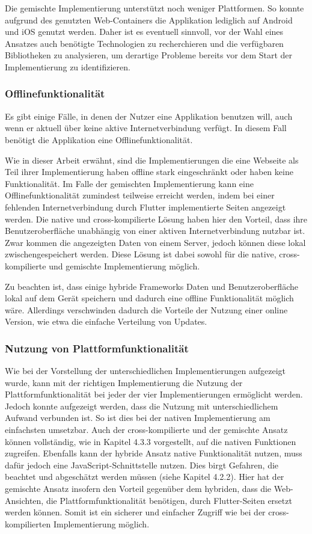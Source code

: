 Die gemischte Implementierung unterstützt noch weniger Plattformen. So konnte aufgrund des genutzten Web-Containers die Applikation lediglich auf Android und iOS genutzt werden.
Daher ist es eventuell sinnvoll, vor der Wahl eines Ansatzes auch benötigte Technologien zu recherchieren und die verfügbaren Bibliotheken zu analysieren, um derartige Probleme bereits vor dem Start der Implementierung zu identifizieren.


\subsubsection{Offlinefunktionalität}
Es gibt einige Fälle, in denen der Nutzer eine Applikation benutzen will, auch wenn er aktuell über keine aktive Internetverbindung verfügt. In diesem Fall benötigt die Applikation eine Offlinefunktionalität.

Wie in dieser Arbeit erwähnt, sind die Implementierungen die eine Webseite als Teil ihrer Implementierung haben offline stark eingeschränkt oder haben keine Funktionalität. Im Falle der gemischten Implementierung kann eine Offlinefunktionalität zumindest teilweise erreicht werden, indem bei einer fehlenden Internetverbindung durch Flutter implementierte Seiten angezeigt werden. Die native und cross-kompilierte Lösung haben hier den Vorteil, dass ihre Benutzeroberfläche unabhängig von einer aktiven Internetverbindung nutzbar ist. Zwar kommen die angezeigten Daten von einem Server, jedoch können diese lokal zwischengespeichert werden. Diese Lösung ist dabei sowohl für die native, cross-kompilierte und gemischte Implementierung möglich. 

Zu beachten ist, dass einige hybride Frameworks Daten und Benutzeroberfläche lokal auf dem Gerät speichern und dadurch eine offline Funktionalität möglich wäre. Allerdings verschwinden dadurch die Vorteile der Nutzung einer online Version, wie etwa die einfache Verteilung von Updates.

\subsubsection{Nutzung von Plattformfunktionalität}
Wie bei der Vorstellung der unterschiedlichen Implementierungen aufgezeigt wurde, kann mit der richtigen Implementierung die Nutzung der Plattformfunktionalität bei jeder der vier Implementierungen ermöglicht werden. Jedoch konnte aufgezeigt werden, dass die Nutzung mit unterschiedlichem Aufwand verbunden ist. So ist dies bei der nativen Implementierung am einfachsten umsetzbar. Auch der cross-kompilierte und der gemischte Ansatz können vollständig, wie in Kapitel 4.3.3 vorgestellt, auf die nativen Funktionen zugreifen. Ebenfalls kann der hybride Ansatz native Funktionalität nutzen, muss dafür jedoch eine JavaScript-Schnittstelle nutzen. Dies birgt Gefahren, die beachtet und abgeschätzt werden müssen (siehe Kapitel 4.2.2). Hier hat der gemischte Ansatz insofern den Vorteil gegenüber dem hybriden, dass die Web-Ansichten, die Plattformfunktionalität benötigen, durch Flutter-Seiten ersetzt werden können. Somit ist ein sicherer und einfacher Zugriff wie bei der cross-kompilierten Implementierung möglich.
